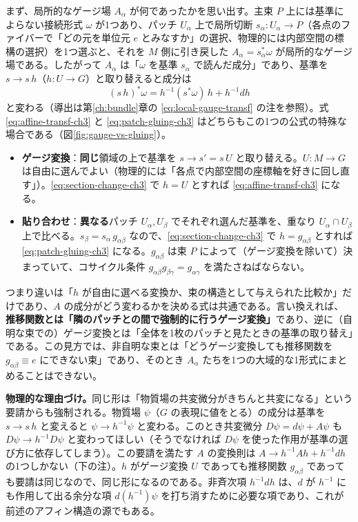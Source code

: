 \documentclass[uplatex, dvipdfmx, book]{jsbook}
\begin{document}
まず、局所的なゲージ場 $A_\alpha$ が何であったかを思い出す。主束 $P$ 上には基準によらない接続形式 $\omega$ が1つあり、パッチ $U_\alpha$ 上で局所切断 $s_\alpha: U_\alpha \to P$（各点のファイバーで「どの元を単位元 $e$ とみなすか」の選択、物理的には内部空間の標構の選択）を1つ選ぶと、それを $M$ 側に引き戻した $A_\alpha = s_\alpha^*\omega$ が局所的なゲージ場である。したがって $A_\alpha$ は「$\omega$ を基準 $s_\alpha$ で読んだ成分」であり、基準を $s \to s\,h$（$h: U \to G$）と取り替えると成分は
\begin{equation}
    (s\,h)^*\omega = h^{-1}(s^*\omega)\,h + h^{-1}dh
    \label{eq:section-change-ch3}
\end{equation}
と変わる（導出は第\ref{ch:bundle}章の \eqref{eq:local-gauge-transf} の注を参照）。式 \eqref{eq:affine-transf-ch3} と \eqref{eq:patch-gluing-ch3} はどちらもこの1つの公式の特殊な場合である（図\ref{fig:gauge-vs-gluing}）。
\begin{itemize}
    \item \textbf{ゲージ変換}：\textbf{同じ}領域の上で基準を $s \to s' = s\,U$ と取り替える。$U: M \to G$ は自由に選んでよい（物理的には「各点で内部空間の座標軸を好きに回し直す」）。\eqref{eq:section-change-ch3} で $h = U$ とすれば \eqref{eq:affine-transf-ch3} になる。
    \item \textbf{貼り合わせ}：\textbf{異なる}パッチ $U_\alpha, U_\beta$ でそれぞれ選んだ基準を、重なり $U_\alpha \cap U_\beta$ 上で比べる。$s_\beta = s_\alpha\, g_{\alpha\beta}$ なので、\eqref{eq:section-change-ch3} で $h = g_{\alpha\beta}$ とすれば \eqref{eq:patch-gluing-ch3} になる。$g_{\alpha\beta}$ は束 $P$ によって（ゲージ変換を除いて）決まっていて、コサイクル条件 $g_{\alpha\beta}g_{\beta\gamma} = g_{\alpha\gamma}$ を満たさねばならない。
\end{itemize}
つまり違いは「$h$ が自由に選べる変換か、束の構造として与えられた比較か」だけであり、$A$ の成分がどう変わるかを決める式は共通である。言い換えれば、\textbf{推移関数とは「隣のパッチとの間で強制的に行うゲージ変換」}であり、逆に（自明な束での）ゲージ変換とは「全体を1枚のパッチと見たときの基準の取り替え」である。この見方では、非自明な束とは「どうゲージ変換しても推移関数を $g_{\alpha\beta} \equiv e$ にできない束」であり、そのとき $A_\alpha$ たちを1つの大域的な1形式にまとめることはできない。

\textbf{物理的な理由づけ。}同じ形は「物質場の共変微分がきちんと共変になる」という要請からも強制される。物質場 $\psi$（$G$ の表現に値をとる）の成分は基準を $s \to s\,h$ と変えると $\psi \to h^{-1}\psi$ と変わる。このとき共変微分 $D\psi = d\psi + A\psi$ も $D\psi \to h^{-1}D\psi$ と変わってほしい（そうでなければ $D\psi$ を使った作用が基準の選び方に依存してしまう）。この要請を満たす $A$ の変換則は $A \to h^{-1}Ah + h^{-1}dh$ の1つしかない（下の注）。$h$ がゲージ変換 $U$ であっても推移関数 $g_{\alpha\beta}$ であっても要請は同じなので、同じ形になるのである。非斉次項 $h^{-1}dh$ は、$d$ が $h^{-1}$ にも作用して出る余分な項 $d(h^{-1})\psi$ を打ち消すために必要な項であり、これが前述のアフィン構造の源でもある。
\end{document}
